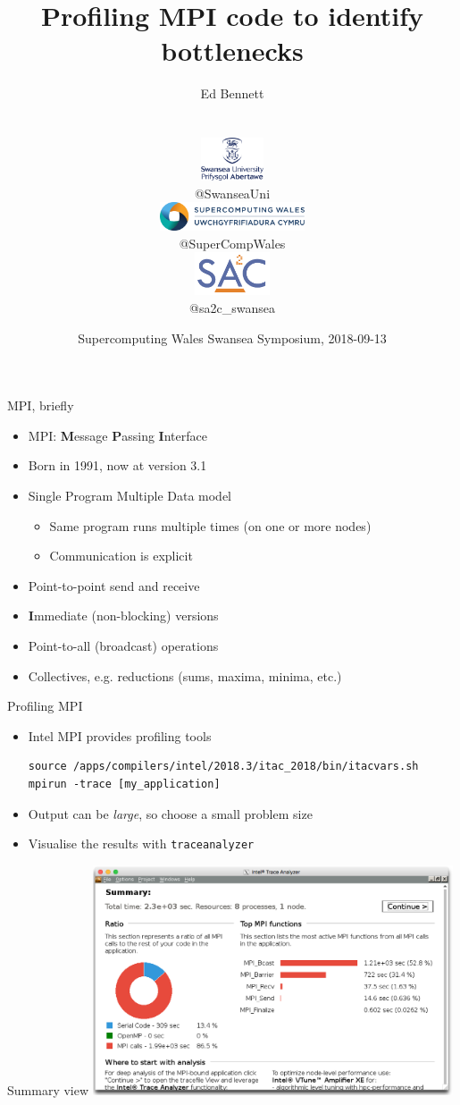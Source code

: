 \documentclass[handout]{beamer}
\title{Profiling MPI code to identify bottlenecks}
\author{{\large Ed Bennett}
	\\{\small@QuantumofEd}
	\\\vspace{16pt}
	\hfill
	\parbox{0.22\textwidth}{\centering\includegraphics[height=36pt]{logos/swansea}\\\small @SwanseaUni}
	\parbox{0.44\textwidth}{\centering\includegraphics[height=24pt]{logos/scw}\\\small @SuperCompWales}
	\parbox{0.22\textwidth}{\centering\includegraphics[height=36pt]{logos/sa2c}\\\small @sa2c\_swansea} }
\date{Supercomputing Wales Swansea Symposium, 2018-09-13}
\begin{document}
\frame{\titlepage}

\begin{frame}[fragile]{MPI, briefly}
	\begin{itemize}[<+->]
		\item MPI: \textbf{M}essage \textbf{P}assing \textbf{I}nterface
		\item Born in 1991, now at version 3.1
		\item Single Program Multiple Data model
		\begin{itemize}[<+->]
			\item Same program runs multiple times (on one or more nodes)
			\item Communication is explicit
		\end{itemize}
		\item Point-to-point send and receive
		\item \textbf{I}mmediate (non-blocking) versions
		\item Point-to-all (broadcast) operations
		\item Collectives, e.g. reductions (sums, maxima, minima, etc.)
	\end{itemize}
\end{frame}

\begin{frame}[fragile]{Profiling MPI}
	\begin{itemize}[<+->]
		\item Intel MPI provides profiling tools
		\begin{verbatim}source /apps/compilers/intel/2018.3/itac_2018/bin/itacvars.sh
mpirun -trace [my_application]\end{verbatim}
		\item Output can be \emph{large}, so choose a small problem size
		\item Visualise the results with \verb|traceanalyzer|
	\end{itemize}
\end{frame}

\begin{frame}{Summary view}
	\centering
	\includegraphics[width=0.8\textwidth]{figs/first-overview}
\end{frame}
\end{document}
